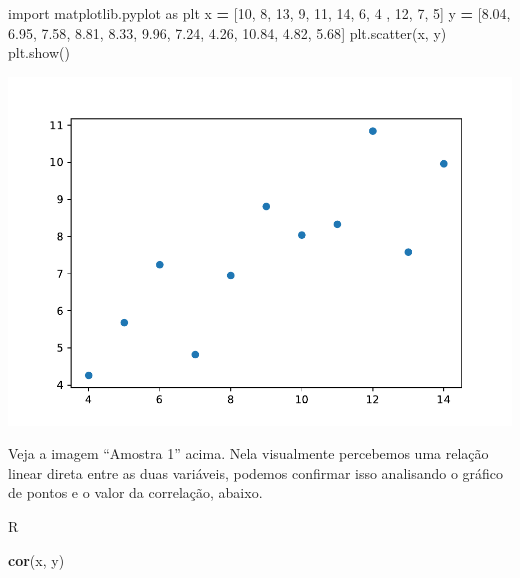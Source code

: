 \documentclass[
]{book}
\newenvironment{Shaded}{\begin{snugshade}}{\end{snugshade}}
\newcommand{\DecValTok}[1]{\textcolor[rgb]{0.00,0.00,0.81}{#1}}
\newcommand{\FloatTok}[1]{\textcolor[rgb]{0.00,0.00,0.81}{#1}}
\newcommand{\FunctionTok}[1]{\textcolor[rgb]{0.13,0.29,0.53}{\textbf{#1}}}
\newcommand{\ImportTok}[1]{#1}
\newcommand{\NormalTok}[1]{#1}
\newcommand{\OperatorTok}[1]{\textcolor[rgb]{0.81,0.36,0.00}{\textbf{#1}}}
\begin{document}
\begin{Shaded}
\begin{Highlighting}[]
\ImportTok{import}\NormalTok{ matplotlib.pyplot }\ImportTok{as}\NormalTok{ plt}
\NormalTok{x }\OperatorTok{=}\NormalTok{ [}\DecValTok{10}\NormalTok{, }\DecValTok{8}\NormalTok{, }\DecValTok{13}\NormalTok{, }\DecValTok{9}\NormalTok{, }\DecValTok{11}\NormalTok{, }\DecValTok{14}\NormalTok{, }\DecValTok{6}\NormalTok{, }\DecValTok{4}\NormalTok{ , }\DecValTok{12}\NormalTok{, }\DecValTok{7}\NormalTok{, }\DecValTok{5}\NormalTok{]}
\NormalTok{y }\OperatorTok{=}\NormalTok{ [}\FloatTok{8.04}\NormalTok{, }\FloatTok{6.95}\NormalTok{, }\FloatTok{7.58}\NormalTok{, }\FloatTok{8.81}\NormalTok{, }\FloatTok{8.33}\NormalTok{, }\FloatTok{9.96}\NormalTok{, }\FloatTok{7.24}\NormalTok{, }\FloatTok{4.26}\NormalTok{, }\FloatTok{10.84}\NormalTok{, }\FloatTok{4.82}\NormalTok{, }\FloatTok{5.68}\NormalTok{]}
\NormalTok{plt.scatter(x, y)}
\NormalTok{plt.show()}
\end{Highlighting}
\end{Shaded}

\includegraphics{_main_files/figure-latex/unnamed-chunk-8-1.pdf}

Veja a imagem ``Amostra 1'' acima. Nela visualmente percebemos uma relação linear direta entre as duas variáveis, podemos confirmar isso analisando o gráfico de pontos e o valor da correlação, abaixo.

R

\begin{Shaded}
\begin{Highlighting}[]
\FunctionTok{cor}\NormalTok{(x, y)  }
\end{Highlighting}
\end{Shaded}
\end{document}
